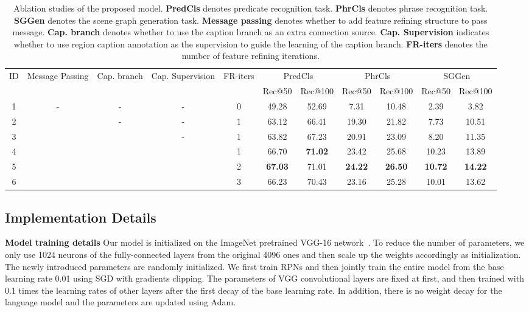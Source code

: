 \begin{table*}[t]
	\renewcommand{\arraystretch}{1.1}
	\setlength{\tabcolsep}{4pt}
	\small
	\begin{center}
		\begin{tabularx}{1.0\linewidth}{c| cccc | cccccc}
			\hline
			\multirow{2}{*}{ID} & \multirow{2}{*}{Message Passing} & \multirow{2}{*}{Cap. branch} & \multirow{2}{*}{Cap. Supervision} & \multirow{2}{*}{FR-iters} & \multicolumn{2}{c}{PredCls} & \multicolumn{2}{c}{PhrCls} & \multicolumn{2}{c}{SGGen} \\
			& & & & & Rec@50& Rec@100 & Rec@50 & Rec@100 & Rec@50 & Rec@100 \\
			\hline
			1 & -  & - & - & 0 & 49.28 & 52.69 & 7.31& 10.48 & 2.39 & 3.82 \\
			2 & \checkmark & - & - & 1 & 63.12 & 66.41 & 19.30 & 21.82 & 7.73 & 10.51\\
			3 &\checkmark & \checkmark & - & 1 & 63.82 &  67.23& 20.91 & 23.09 & 8.20 & 11.35 \\
			4 &\checkmark & \checkmark & \checkmark & 1 & 66.70 & \textbf{71.02} & 23.42 & 25.68 & 10.23 & 13.89\\
			5 &\checkmark & \checkmark & \checkmark & 2 & \textbf{67.03} & 71.01& \textbf{24.22} & \textbf{26.50} & \textbf{10.72} & \textbf{14.22} \\
			6 &\checkmark & \checkmark & \checkmark & 3 & 66.23 & 70.43& 23.16&  25.28& 10.01& 13.62\\
			\hline
		\end{tabularx}
	\end{center}
	\caption{Ablation studies of the proposed model. \textbf{PredCls} denotes predicate recognition task. \textbf{PhrCls} denotes phrase recognition task. \textbf{SGGen} denotes the scene graph generation task. \textbf{Message passing} denotes whether to add feature refining structure to pass message.  \textbf{Cap. branch} denotes whether to use the caption branch as an extra connection source. \textbf{Cap. Supervision} indicates whether to use region caption annotation as the supervision to guide the learning of the caption branch. \textbf{FR-iters} denotes the number of feature refining iterations.}
	\label{tab:component}
\end{table*}

\subsection{Implementation Details}

\textbf{Model training details} 
Our model is initialized on the ImageNet pretrained VGG-16 network~\cite{VGG}. To reduce the number of parameters, we only use 1024 neurons of the fully-connected layers from the original 4096 ones and then scale up the weights accordingly as initialization. The newly introduced parameters are randomly initialized. We first train RPNs and then jointly train the entire model from the base learning rate 0.01 using SGD with gradients clipping. The parameters of VGG convolutional layers are fixed at first, and then trained with 0.1 times the learning rates of other layers after the first decay of the base learning rate. In addition, there is no weight decay for the language model and the parameters are updated using Adam. 

